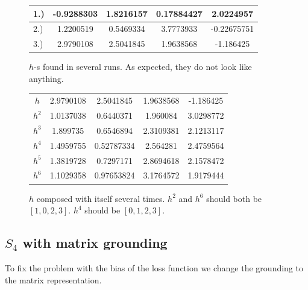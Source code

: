 \begin{figure}
\center
\caption{$h$-s found in several runs. As expected, they do not look like anything.}
\label{table:s4_half_basic}
\begin{tabular}{l|cccc}
1.)&-0.9288303 & 1.8216157 & 0.17884427 & 2.0224957\\
\hline
2.)&1.2200519 & 0.5469334 & 3.7773933 & -0.22675751\\
 \hline
3.)&2.9790108 & 2.5041845 & 1.9638568 & -1.186425\\
\end{tabular}
\end{figure}

\begin{figure}
\center
\caption{$h$ composed with itself several times. $h^2$ and $h^6$ should both be $[1,0,2,3]$. $h^4$ should be $[0,1,2,3]$.}
\label{table:s4_half_basic_gen}
\begin{tabular}{c|cccc}
$h$   & 2.9790108 & 2.5041845 & 1.9638568 & -1.186425\\
$h^2$ & 1.0137038 & 0.6440371 & 1.960084 & 3.0298772\\
$h^3$ & 1.899735 & 0.6546894 & 2.3109381 & 2.1213117\\
$h^4$ & 1.4959755 & 0.52787334 & 2.564281 & 2.4759564\\
$h^5$ & 1.3819728 & 0.7297171 & 2.8694618 & 2.1578472\\
$h^6$ & 1.1029358 & 0.97653824 & 3.1764572 & 1.9179444\\

\end{tabular}
\end{figure}

\subsection{$S_4$ with matrix grounding}
To fix the problem with the bias of the loss function we change the grounding to the matrix representation.

